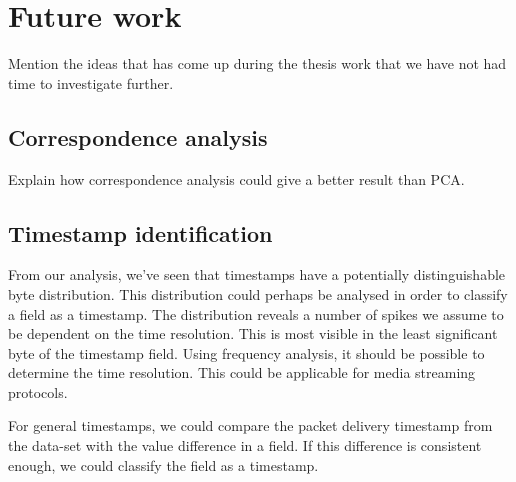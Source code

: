 \documentclass[a4paper]{report}
\begin{document}

\section{Future work}
Mention the ideas that has come up during the thesis work that we have not had
time to investigate further.

\subsection{Correspondence analysis}
Explain how correspondence analysis could give a better result than PCA.

\subsection{Timestamp identification}
From our analysis, we've seen that timestamps have a potentially
distinguishable byte distribution. This distribution could perhaps be analysed
in order to classify a field as a timestamp. The distribution reveals a number
of spikes we assume to be dependent on the time resolution. This is most
visible in the least significant byte of the timestamp field. Using frequency
analysis, it should be possible to determine the time resolution. This could
be applicable for media streaming protocols.

For general timestamps, we could compare the packet delivery timestamp from
the data-set with the value difference in a field. If this difference is
consistent enough, we could classify the field as a timestamp.



\end{document}
